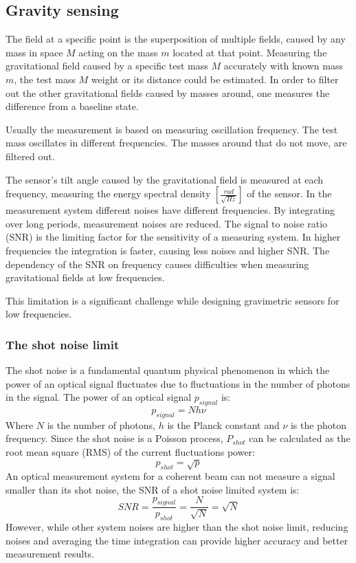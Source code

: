 \documentclass[\main/master.tex]{subfiles}
\begin{document}
\subsection{Gravity sensing}
The field at a specific point is the superposition of multiple fields, caused by any mass in space $M$ acting on the mass $m$ located at that point. Measuring the gravitational field caused by a specific test mass $M$ accurately with known mass $m$, the test mass $M$ weight or its distance could be estimated. In order to filter out the other gravitational fields caused by masses around, one measures the difference from a baseline state.
\par\noindent
Usually the measurement is based on measuring oscillation frequency. The test mass oscillates in different frequencies. The masses around that do not move, are filtered out.
\par\noindent
The sensor's tilt angle caused by the gravitational field is measured at each frequency, measuring the energy spectral density $[\frac{rad}{\sqrt{Hz}}]$ of the sensor.
In the measurement system different noises have different frequencies. By integrating over long periods, measurement noises are reduced. The signal to noise ratio (SNR) is the limiting factor for the sensitivity of a measuring system. In higher frequencies the integration is faster, causing less noises and higher SNR.
The dependency of the SNR on frequency causes difficulties when measuring gravitational fields at low frequencies.
\par\noindent
This limitation is a significant challenge while designing gravimetric sensors for low frequencies.

\subsubsection{The shot noise limit}
The shot noise is a fundamental quantum physical phenomenon in which the power of an optical signal fluctuates due to fluctuations in the number of photons in the signal. The power of an optical signal $p_{signal}$ is:
\begin{equation}
p_{signal} = N h \nu   \label{eqn:signal_power}
\end{equation}
Where $N$ is the number of photons, $h$ is the Planck constant and $\nu$ is the photon frequency. Since the shot noise is a Poisson process, $P_{shot}$ can be calculated as the root mean square (RMS) of the current fluctuations power:
\begin{equation}
p_{shot} = \sqrt{p}    \label{eqn:shot_power}
\end{equation}
An optical measurement system for a coherent beam can not measure a signal smaller than its shot noise, the SNR of a shot noise limited system is:
\begin{equation}
SNR = \frac{p_{signal}}{p_{shot}} =\frac{N}{\sqrt{N}} = \sqrt{N}    \label{eqn:shot_noise}
\end{equation}
However, while other system noises are higher than the shot noise limit, reducing noises and averaging the time integration can provide higher accuracy and better measurement results. 
\end{document}
